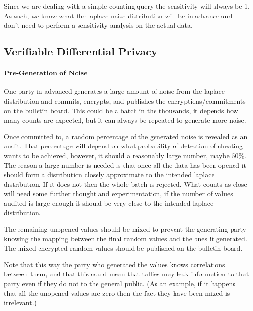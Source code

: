 \documentclass[10pt,a4paper]{article}
\begin{document}
Since we are dealing with a simple counting query the sensitivity will always be 1. As such, we know what the laplace noise distribution will be in advance and don't need to perform a sensitivity analysis on the actual data.


\subsection{Verifiable Differential Privacy}

\paragraph{Pre-Generation of Noise}

One party in advanced generates a large amount of noise from the laplace distribution and commits, encrypts, and publishes the encryptions/commitments on the bulletin board. This could be a batch in the thousands, it depends how many counts are expected, but it can always be repeated to generate more noise.

Once committed to, a random percentage of the generated noise is revealed as an audit. That percentage will depend on what probability of detection of cheating wants to be achieved, however, it should a reasonably large number, maybe 50\%. The reason a large number is needed is that once all the data has been opened it should form a distribution closely approximate to the intended laplace distribution. If it does not then the whole batch is rejected. What counts as close will need some further thought and experimentation, if the number of values audited is large enough it should be very close to the intended laplace distribution.

The remaining unopened values should be mixed to prevent the generating party knowing the mapping between the final random values and the ones it generated. The mixed encrypted random values should be published on the bulletin board.

Note that this way the party who generated the values knows correlations between them, and that this could mean that tallies may leak information to that party even if they do not to the general public. (As an example, if it happens that all the unopened values are zero then the fact they have been mixed is irrelevant.)
\end{document}
